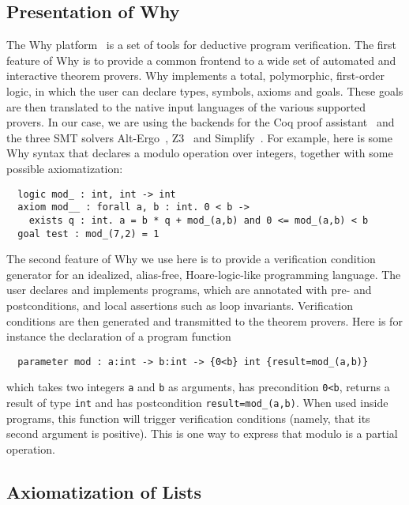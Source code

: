 \documentclass[runningheads,a4paper]{llncs}
\newcommand{\beforesub}{\vspace{-0.2cm}}
\newcommand{\aftersub}{\vspace{-0.1cm}}
\begin{document}
\beforesub
\subsection{Presentation of Why}
\label{subsec:why}
\aftersub

The Why platform~\cite{why} is a set of tools for deductive program
verification. The first feature of Why is to provide a common
frontend to a wide set of automated and interactive theorem provers. 
Why implements a total, polymorphic, first-order logic, in which the user can
declare types, symbols, axioms and goals. These goals are then
translated to the native input languages of the various supported
provers. In our case, we are using the backends for the Coq proof
assistant~\cite{coq} and the three SMT solvers Alt-Ergo~\cite{alt-ergo},
Z3~\cite{Z3} and Simplify~\cite{Simplify}.
%
For example, here is some Why syntax that declares a
modulo operation over integers, together with some possible axiomatization:
\begin{verbatim}
  logic mod_ : int, int -> int
  axiom mod__ : forall a, b : int. 0 < b -> 
    exists q : int. a = b * q + mod_(a,b) and 0 <= mod_(a,b) < b 
  goal test : mod_(7,2) = 1
\end{verbatim}
The second feature of Why we use here is to provide a
verification condition generator for an idealized, alias-free,
Hoare-logic-like programming language. The user declares and
implements programs, which are annotated with pre- and postconditions,
and local assertions such as loop invariants. Verification conditions
are then generated and transmitted to the theorem provers.
Here is for instance the declaration of a program function
\begin{verbatim}
  parameter mod : a:int -> b:int -> {0<b} int {result=mod_(a,b)}
\end{verbatim}
which takes two integers \texttt{a} and \texttt{b} as arguments, has
precondition \texttt{0<b}, returns a result of type \texttt{int} and
has postcondition \verb|result=mod_(a,b)|. When used inside programs,
this function will trigger verification conditions (namely, that
its second argument is positive). This is one way to express that
modulo is a partial operation.


\beforesub
\subsection{Axiomatization of Lists}
\aftersub
\end{document}
